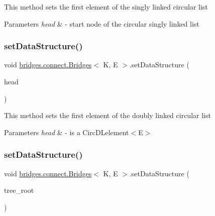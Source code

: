 This method sets the first element of the singly linked circular list


\begin{DoxyParams}{Parameters}
{\em head} & -\/ start node of the circular singly linked list \\
\hline
\end{DoxyParams}
\hypertarget{classbridges_1_1connect_1_1_bridges_a4e5809b18d15854b54509f9d434a4fd7}{}\label{classbridges_1_1connect_1_1_bridges_a4e5809b18d15854b54509f9d434a4fd7} 
\subsubsection{\texorpdfstring{set\+Data\+Structure()}{setDataStructure()}\hspace{0.1cm}{\footnotesize\ttfamily [6/12]}}
{\footnotesize\ttfamily void \hyperlink{classbridges_1_1connect_1_1_bridges}{bridges.\+connect.\+Bridges}$<$ K, E $>$.set\+Data\+Structure (\begin{DoxyParamCaption}\item[{\hyperlink{classbridges_1_1base_1_1_circ_d_lelement}{Circ\+D\+Lelement}$<$ E $>$}]{head }\end{DoxyParamCaption})}

This method sets the first element of the doubly linked circular list


\begin{DoxyParams}{Parameters}
{\em head} & -\/ is a Circ\+D\+Lelement$<$\+E$>$ \\
\hline
\end{DoxyParams}
\hypertarget{classbridges_1_1connect_1_1_bridges_a0788905a16b9a8f3deb0b4a344f2b42d}{}\label{classbridges_1_1connect_1_1_bridges_a0788905a16b9a8f3deb0b4a344f2b42d} 
\subsubsection{\texorpdfstring{set\+Data\+Structure()}{setDataStructure()}\hspace{0.1cm}{\footnotesize\ttfamily [7/12]}}
{\footnotesize\ttfamily void \hyperlink{classbridges_1_1connect_1_1_bridges}{bridges.\+connect.\+Bridges}$<$ K, E $>$.set\+Data\+Structure (\begin{DoxyParamCaption}\item[{\hyperlink{classbridges_1_1base_1_1_tree_element}{Tree\+Element}$<$ E $>$}]{tree\+\_\+root }\end{DoxyParamCaption})}

